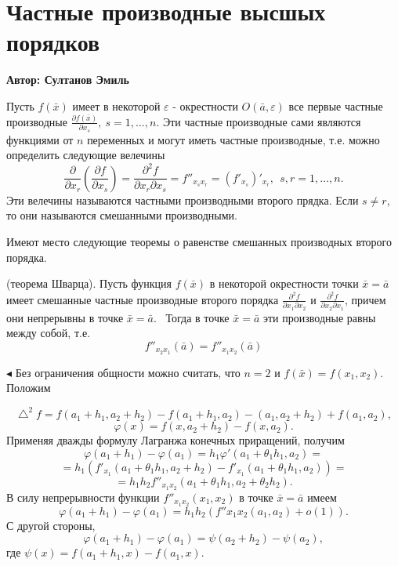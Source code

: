 \setcounter{object}{0}
\setcounter{approval}{0}
\setcounter{theorem}{0}
\setcounter{example}{0}
\chapter{Частные производные высшых порядков}
\vskip-1cm
\centerline{\bf Автор: Султанов Эмиль}\vskip 1cm


\parindent=1cm
Пусть $f(\bar{x})$ имеет в некоторой $\varepsilon$ - окрестности $O(\bar{a},\varepsilon)$ все первые частные производные $\frac{\partial f(\bar{x})}{\partial x_s} ,\ s=1,\ldots,n$. Эти частные производные сами являются функциями от $n$ переменных и могут иметь частные производные, т.е. можно определить следующие велечины 
 $$\frac{\partial}{\partial x_r} \left(\frac{\partial f}{\partial x_s}\right) = \frac{\partial^2 f}{\partial x_r \partial x_s}=f''_{{x_s}{x_r}}=\left(f'_{x_s}\right)'_{x_r}, \ \ s,r=1,\ldots,n.$$
Эти велечины называются  частными производными второго прядка. Если $s\neq r$, то они называются смешанными производными.

\parindent=1cm
Имеют место следующие теоремы о равенстве смешанных производных второго порядка.

\begin{theorem}
(теорема Шварца).  Пусть функция $f(\bar{x})$ в некоторой окрестности точки $\bar{x}=\bar{a}$ имеет смешанные частные производные второго порядка $\frac{\partial^2 f}{\partial x_1 \partial x_2}$ и $\frac{\partial^2 f}{\partial x_2 \partial x_1}$, причем они непрерывны в точке $\bar{x}=\bar{a}$. \ Тогда в точке $\bar{x}=\bar{a}$ эти производные равны между собой, т.е.
 $$f''_{{x_2}{x_1}}(\bar{a})=f''_{{x_1}{x_2}}(\bar{a})$$
\end{theorem}
$\blacktriangleleft$
Без ограничения общности можно считать, что $n=2$ и $f(\bar{x})=f(x_1,x_2)$. Положим

$$\bigtriangleup^2 f=f(a_1+h_1,a_2+h_2)-f(a_1+h_1,a_2)-(a_1,a_2+h_2)+f(a_1,a_2),$$
$$ \varphi (x)=f(x,a_2+h_2)-f(x,a_2).$$
Применяя дважды формулу Лагранжа конечных приращений, получим
$$\varphi (a_1+h_1)-\varphi (a_1)=h_1\varphi' (a_1+\theta_1 h_1,a_2)=$$
$$=h_1\left(f'_{x_1}(a_1+\theta_1 h_1,a_2+h_2)-f'_{x_1}(a_1+\theta_1 h_1,a_2) \right)=$$
$$=h_1 h_2 f''_{{x_1}{x_2}}(a_1+\theta_1 h_1,a_2+\theta_2 h_2).$$
В силу непрерывности функции $f''_{{x_1}{x_2}}(x_1,x_2)$ в точке $\bar{x}=\bar{a}$ имеем
$$\varphi (a_1+h_1)- \varphi (a_1)=h_1 h_2 (f''{{x_1}{x_2}}(a_1,a_2)+o(1)).$$
С другой стороны,
$$\varphi (a_1 + h_1)- \varphi (a_1)=\psi (a_2+h_2)-\psi (a_2),$$
где $\psi (x)=f(a_1+h_1,x)-f(a_1,x).$

